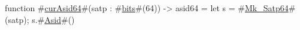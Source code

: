 function #\hyperref[sailRISCVzcurAsid64]{curAsid64}#(satp : #\hyperref[sailRISCVzbits]{bits}#(64)) -> asid64 = {
  let s = #\hyperref[sailRISCVzMkzySatp64]{Mk\_Satp64}#(satp);
  s.#\hyperref[sailRISCVzAsid]{Asid}#()
}
